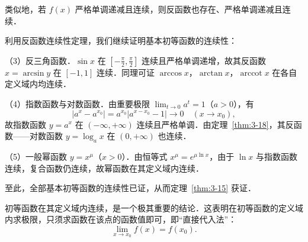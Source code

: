 类似地，若 $f(x)$ 严格单调递减且连续，则反函数也存在、严格单调递减且连续．

利用反函数连续性定理，我们继续证明基本初等函数的连续性：

（3）反三角函数．$\sin x$ 在 $[-\frac{\pi}{2}, \frac{\pi}{2}]$ 连续且严格单调递增，故其反函数 $x = \arcsin y$ 在 $[-1, 1]$ 连续．同理可证 $\arccos x$，$\arctan x$，$\operatorname{arccot} x$ 在各自定义域内均连续．

（4）指数函数与对数函数．由重要极限 $\lim_{t \to 0} a^t = 1$（$a > 0$），有
\[
|a^x - a^{x_0}| = a^{x_0}|a^{x - x_0} - 1| \to 0 \quad (x \to x_0),
\]
故指数函数 $y = a^x$ 在 $(-\infty, +\infty)$ 连续且严格单调．由定理~\ref{thm:3-18}，其反函数——对数函数 $y = \log_a x$ 在 $(0, +\infty)$ 也连续．

（5）一般幂函数 $y = x^\mu$（$x > 0$）．由恒等式 $x^\mu = e^{\mu \ln x}$，由于 $\ln x$ 与指数函数连续，复合函数仍连续，故幂函数在其定义域内连续．

至此，全部基本初等函数的连续性已证，从而定理~\ref{thm:3-15} 获证．

初等函数在其定义域内连续，是一个极其重要的结论．这表明在初等函数的定义域内求极限，只须求函数在该点的函数值即可，即``直接代入法''：
\[
\lim_{x \to x_0} f(x) = f(x_0).
\]

